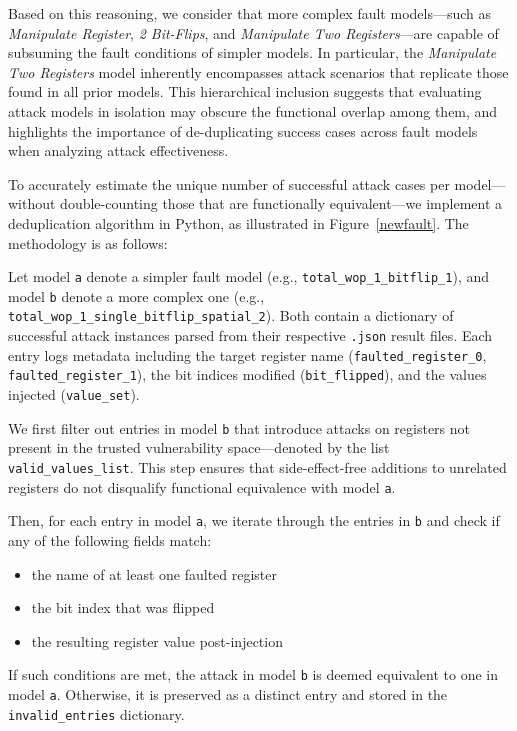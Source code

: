 Based on this reasoning, we consider that more complex fault models—such as \textit{Manipulate Register}, \textit{2 Bit-Flips}, and \textit{Manipulate Two Registers}—are capable of subsuming the fault conditions of simpler models. In particular, the \textit{Manipulate Two Registers} model inherently encompasses attack scenarios that replicate those found in all prior models. This hierarchical inclusion suggests that evaluating attack models in isolation may obscure the functional overlap among them, and highlights the importance of de-duplicating success cases across fault models when analyzing attack effectiveness.


To accurately estimate the unique number of successful attack cases per model—without double-counting those that are functionally equivalent—we implement a deduplication algorithm in Python, as illustrated in Figure~\ref{newfault}. The methodology is as follows:

Let model \texttt{a} denote a simpler fault model (e.g., \texttt{total\_wop\_1\_bitflip\_1}), and model \texttt{b} denote a more complex one (e.g., \texttt{total\_wop\_1\_single\_bitflip\_spatial\_2}). Both contain a dictionary of successful attack instances parsed from their respective \texttt{.json} result files. Each entry logs metadata including the target register name (\texttt{faulted\_register\_0}, \texttt{faulted\_register\_1}), the bit indices modified (\texttt{bit\_flipped}), and the values injected (\texttt{value\_set}).

We first filter out entries in model \texttt{b} that introduce attacks on registers not present in the trusted vulnerability space—denoted by the list \texttt{valid\_values\_list}. This step ensures that side-effect-free additions to unrelated registers do not disqualify functional equivalence with model \texttt{a}.

Then, for each entry in model \texttt{a}, we iterate through the entries in \texttt{b} and check if any of the following fields match:
\begin{itemize}
    \item the name of at least one faulted register
    \item the bit index that was flipped
    \item the resulting register value post-injection
\end{itemize}

If such conditions are met, the attack in model \texttt{b} is deemed equivalent to one in model \texttt{a}. Otherwise, it is preserved as a distinct entry and stored in the \texttt{invalid\_entries} dictionary.

